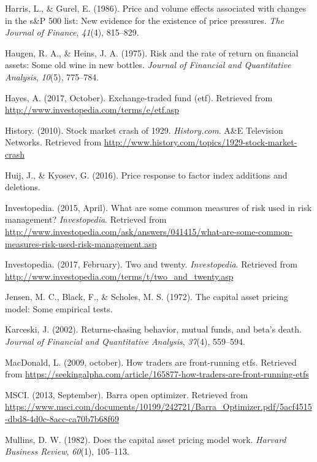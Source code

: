 \documentclass[12pt,twoside]{reedthesis}
\theoremstyle{definition}
\theoremstyle{definition}
\theoremstyle{definition}
\theoremstyle{remark}
\begin{document}
\hypertarget{ref-harris1986}{}
Harris, L., \& Gurel, E. (1986). Price and volume effects associated
with changes in the s\&P 500 list: New evidence for the existence of
price pressures. \emph{The Journal of Finance}, \emph{41}(4), 815--829.

\hypertarget{ref-haugen1975}{}
Haugen, R. A., \& Heins, J. A. (1975). Risk and the rate of return on
financial assets: Some old wine in new bottles. \emph{Journal of
Financial and Quantitative Analysis}, \emph{10}(5), 775--784.

\hypertarget{ref-hayes2017}{}
Hayes, A. (2017, October). Exchange-traded fund (etf). Retrieved from
\url{http://www.investopedia.com/terms/e/etf.asp}

\hypertarget{ref-history2010}{}
History. (2010). Stock market crash of 1929. \emph{History.com}. A\&E
Television Networks. Retrieved from
\url{http://www.history.com/topics/1929-stock-market-crash}

\hypertarget{ref-huij2016}{}
Huij, J., \& Kyosev, G. (2016). Price response to factor index additions
and deletions.

\hypertarget{ref-investopedia2015}{}
Investopedia. (2015, April). What are some common measures of risk used
in risk management? \emph{Investopedia}. Retrieved from
\url{http://www.investopedia.com/ask/answers/041415/what-are-some-common-measures-risk-used-risk-management.asp}

\hypertarget{ref-investopedia2017}{}
Investopedia. (2017, February). Two and twenty. \emph{Investopedia}.
Retrieved from
\url{http://www.investopedia.com/terms/t/two_and_twenty.asp}

\hypertarget{ref-jensen1972}{}
Jensen, M. C., Black, F., \& Scholes, M. S. (1972). The capital asset
pricing model: Some empirical tests.

\hypertarget{ref-karceski2002}{}
Karceski, J. (2002). Returns-chasing behavior, mutual funds, and beta's
death. \emph{Journal of Financial and Quantitative Analysis},
\emph{37}(4), 559--594.

\hypertarget{ref-macdonald2009}{}
MacDonald, L. (2009, october). How traders are front-running etfs.
Retrieved from
\url{https://seekingalpha.com/article/165877-how-traders-are-front-running-etfs}

\hypertarget{ref-msci2013}{}
MSCI. (2013, September). Barra open optimizer. Retrieved from
\url{https://www.msci.com/documents/10199/242721/Barra_Optimizer.pdf/5acf4515-dbd8-4d0c-8acc-ca70b7b68f69}

\hypertarget{ref-mullins1982}{}
Mullins, D. W. (1982). Does the capital asset pricing model work.
\emph{Harvard Business Review}, \emph{60}(1), 105--113.
\end{document}
